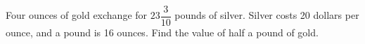 Four ounces of gold exchange for $23\dfrac{3}{10}$ pounds of silver. Silver costs 20 dollars per ounce, and a pound is 16 ounces. Find the value of half a pound of gold.
